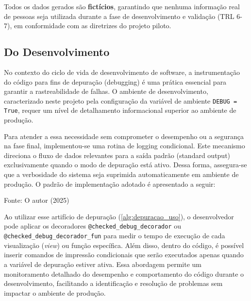 \par Todos os dados gerados são \textbf{fictícios}, garantindo que nenhuma informação real de pessoas seja utilizada durante a fase de desenvolvimento e validação (TRL 6-7), em conformidade com as diretrizes do projeto piloto.


\subsection{Do Desenvolvimento}
\par No contexto do ciclo de vida de desenvolvimento de software, a instrumentação do código para fins de depuração (debugging) é uma prática essencial para garantir a rastreabilidade de falhas. O ambiente de desenvolvimento, caracterizado neste projeto pela configuração da variável de ambiente \texttt{DEBUG = True}, requer um nível de detalhamento informacional superior ao ambiente de produção.

\par Para atender a essa necessidade sem comprometer o desempenho ou a segurança na fase final, implementou-se uma rotina de logging condicional. Este mecanismo direciona o fluxo de dados relevantes para a saída padrão (standard output) exclusivamente quando o modo de depuração está ativo. Dessa forma, assegura-se que a verbosidade do sistema seja suprimida automaticamente em ambiente de produção. O padrão de implementação adotado é apresentado a seguir:

\begin{algorithm}[H]
    
   

   {\fontsize{10pt}{\baselineskip}\selectfont
   Fonte: O autor (2025)}
\end{algorithm}

\par Ao utilizar esse artifício de depuração (\ref{alg:depuracao_uso}), o desenvolvedor pode aplicar os decoradores \texttt{@checked\_debug\_decorador} ou \texttt{@checked\_debug\_decorador\_fun} para medir o tempo de execução de cada visualização (\textit{view}) ou função específica. Além disso, dentro do código, é possível inserir comandos de impressão condicionais que serão executados apenas quando a variável de depuração estiver ativa. Essa abordagem permite um monitoramento detalhado do desempenho e comportamento do código durante o desenvolvimento, facilitando a identificação e resolução de problemas sem impactar o ambiente de produção.


